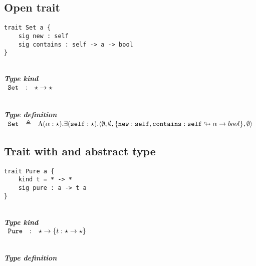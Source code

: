 \documentclass{article}[11pt]
\newcommand{\subsubsubsection}[1]
{
    ~\\
    {\bf {\em #1}} \\
}
\newcommand{\term}[1]{\verb~#1~}
\begin{document}
    \subsection{Open trait}

    \begin{verbatim}
trait Set a {
    sig new : self
    sig contains : self -> a -> bool
}
    \end{verbatim}

    \subsubsubsection{Type kind}

    \noindent
    \begin{math}
        \begin{array}{rclp{5cm}}
            \term{Set}  & : & \star \rightarrow \star
        \end{array}
    \end{math}

    \subsubsubsection{Type definition}

    \noindent
    \begin{math}
        \begin{array}{rclp{5cm}}
            \term{Set} & \triangleq & \Lambda(\alpha:\star).\exists(\term{self}:\star).\langle
            \emptyset,
            \emptyset,
            \{ \term{new} : \term{self}, \term{contains} : \term{self} \looparrowright \alpha \rightarrow bool \},
            \emptyset
            \rangle
        \end{array}
    \end{math}

    \subsection{Trait with and abstract type}\label{subsec:trait-with-and-abstract-type}

    \begin{verbatim}
trait Pure a {
    kind t = * -> *
    sig pure : a -> t a
}
    \end{verbatim}

    \subsubsubsection{Type kind}

    \noindent
    \begin{math}
        \begin{array}{rclp{5cm}}
            \term{Pure} & : & \star \rightarrow \{ t : \star \rightarrow \star \}
        \end{array}
    \end{math}

    \subsubsubsection{Type definition}
\end{document}
